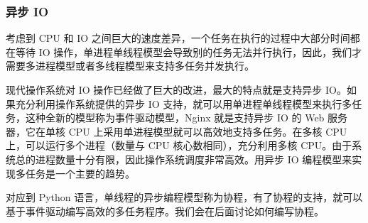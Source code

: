\hypertarget{ux5f02ux6b65-io}{%
\subsubsection{异步 IO}\label{ux5f02ux6b65-io}}

考虑到 CPU 和 IO
之间巨大的速度差异，一个任务在执行的过程中大部分时间都在等待 IO
操作，单进程单线程模型会导致别的任务无法并行执行，因此，我们才需要多进程模型或者多线程模型来支持多任务并发执行。

现代操作系统对 IO 操作已经做了巨大的改进，最大的特点就是支持异步
IO。如果充分利用操作系统提供的异步 IO
支持，就可以用单进程单线程模型来执行多任务，这种全新的模型称为事件驱动模型，Nginx
就是支持异步 IO 的 Web 服务器，它在单核 CPU
上采用单进程模型就可以高效地支持多任务。在多核 CPU
上，可以运行多个进程（数量与 CPU 核心数相同），充分利用多核
CPU。由于系统总的进程数量十分有限，因此操作系统调度非常高效。用异步 IO
编程模型来实现多任务是一个主要的趋势。

对应到 Python
语言，单线程的异步编程模型称为协程，有了协程的支持，就可以基于事件驱动编写高效的多任务程序。我们会在后面讨论如何编写协程。

